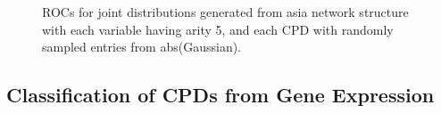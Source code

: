 \documentclass{article} %
\newlength{\subfigheight}
\begin{document}
\begin{figure}[h]
\centering


\caption{ROCs for joint distributions generated from asia network structure with each variable having arity 5, and each CPD with randomly sampled entries from abs(Gaussian).}
\end{figure}



\subsection{Classification of CPDs from Gene Expression}
\end{document}
